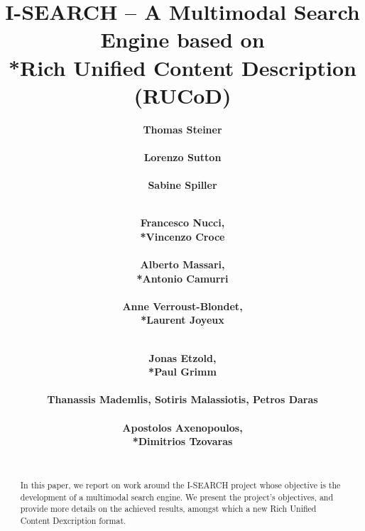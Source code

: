 \documentclass{acm_proc_article-sp}
\begin{document}
\title{I-SEARCH -- A Multimodal Search Engine based on\\*Rich Unified Content Description (RUCoD)}

\author{
\alignauthor
\textbf{Thomas Steiner}\\
	\\
\alignauthor
\textbf{Lorenzo Sutton}\\
	\\
\alignauthor
\textbf{Sabine Spiller}\\ 	
	\\
\and	
\alignauthor	
\textbf{Francesco Nucci,\\*Vincenzo Croce}\\ 	
	\\
\alignauthor
\textbf{Alberto Massari,\\*Antonio Camurri}\\
	\\
\alignauthor	
\textbf{Anne Verroust-Blondet,\\*Laurent Joyeux}\\
	\\
\and
\alignauthor
\textbf{Jonas Etzold,\\*Paul Grimm}\\
	\\
\alignauthor
\textbf{Thanassis Mademlis, Sotiris Malassiotis, Petros Daras}\\
	\\  
\alignauthor
\textbf{Apostolos Axenopoulos,\\*Dimitrios Tzovaras}\\
	\\  
}

\maketitle

\begin{abstract}
In this paper, we report on work around the \mbox{I-SEARCH} project whose objective is the development of a multimodal search engine.
We present the project's objectives, and provide more details on the achieved results, amongst which a new Rich Unified Content Dexcription format. 
\end{abstract}
\end{document}
